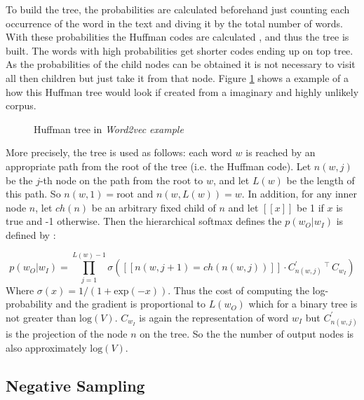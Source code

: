 To build the tree, the probabilities are calculated beforehand just counting
each occurrence of  the word in the text
and diving it by the total number of words.  With these probabilities the
Huffman codes are calculated \cite{huf52}, and thus the tree is built. The
words with high probabilities get shorter codes ending up on top tree. As the
probabilities of the child nodes can be obtained it is not necessary to visit
all then children but just take it from that node. Figure
\ref{fig:huffam-tree-w2v-example} shows a example of a how this Huffman tree
would look if  created from a imaginary and  highly unlikely corpus. 




\begin{figure}[h]
    \centering
    \caption{Huffman tree in \textit{Word2vec example}}
    \label{fig:huffam-tree-w2v-example}
\end{figure}

More precisely, the tree is used as follows: each word $w$ is reached by an
appropriate path from the root of the tree (i.e. the Huffman code). Let
$n(w,j)$ be the $j$-th node on the path from the root to $w$, and let $L(w)$
be the length of this path. So $n(w,1) = \text{root}$ and $n(w,L(w)) = w$. In
addition, for any inner node $n$, let $ch(n)$ be an arbitrary fixed child of
$n$ and let $[\![ x ]\!] $ be 1 if $x$ is true and -1 otherwise. Then the
hierarchical softmax defines the $p(w_O|w_I)$  is defined by \cite{MikolovSCCD13} : 


\begin{equation}
   \label{eq:hierarchical-softmax-prob}
  p(w_O|w_I)  = \prod^{L(w)-1}_{j=1}\sigma\left( [\![n(w,j + 1) = ch(n(w,j))   ]\!] \cdot C^{'}_{n(w,j)}  \,^\top\, C_{w_I}   \right) 
\end{equation}
Where $\sigma(x) = 1/(1 + \text{exp}(-x)) $.  Thus the cost of computing the
log-probability and the gradient is proportional to $L(w_O)$ which for a
binary tree is not greater than $\text{log}(V)$.   $C_{w_{I}}$ is again the
representation  of word $w_{I}$  but   $  C^{'}_{n(w,j)}
$ is the projection of the node $n$ on the tree.  So the the number of output
nodes is also  approximately $\text{log}(V)$.

\subsection{Negative Sampling}




